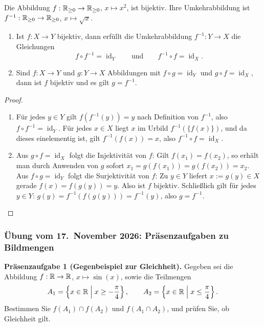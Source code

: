 \begin{beispiel}
Die Abbildung $f:\mathbb{R}_{\ge0}\to\mathbb{R}_{\ge0}$, $x\mapsto x^2$, ist bijektiv.
Ihre Umkehrabbildung ist $f^{-1}:\mathbb{R}_{\ge0}\to\mathbb{R}_{\ge0}$, $x\mapsto\sqrt{x}$.
\end{beispiel}

\begin{satz}
\begin{enumerate}
    \item Ist $f:X\to Y$ bijektiv, dann erfüllt die Umkehrabbildung
    $f^{-1}:Y\to X$ die Gleichungen
    \[
        f\circ f^{-1}=\operatorname{id}_Y
        \qquad\text{und}\qquad
        f^{-1}\circ f=\operatorname{id}_X.
    \]
    \item Sind $f:X\to Y$ und $g:Y\to X$ Abbildungen mit
    $f\circ g=\operatorname{id}_Y$ und $g\circ f=\operatorname{id}_X$,
    dann ist $f$ bijektiv und es gilt $g=f^{-1}$.
\end{enumerate}
\end{satz}
\begin{proof}
\begin{enumerate}
    \item Für jedes $y\in Y$ gilt $f(f^{-1}(y))=y$ nach Definition von $f^{-1}$,
    also $f\circ f^{-1}=\operatorname{id}_Y$. Für jedes $x\in X$ liegt $x$
    im Urbild $f^{-1}(\{f(x)\})$, und da dieses einelementig ist, gilt
    $f^{-1}(f(x))=x$, also $f^{-1}\circ f=\operatorname{id}_X$.
    \item Aus $g\circ f=\operatorname{id}_X$ folgt die Injektivität von $f$:
    Gilt $f(x_1)=f(x_2)$, so erhält man durch Anwenden von $g$ sofort
    $x_1=g(f(x_1))=g(f(x_2))=x_2$.
    Aus $f\circ g=\operatorname{id}_Y$ folgt die Surjektivität von $f$:
    Zu $y\in Y$ liefert $x:=g(y)\in X$ gerade $f(x)=f(g(y))=y$.
    Also ist $f$ bijektiv. Schließlich gilt für jedes $y\in Y$:
    $g(y)=f^{-1}(f(g(y)))=f^{-1}(y)$, also $g=f^{-1}$. \qedhere
\end{enumerate}
\end{proof}

\subsubsection*{Übung vom 17.\ November 2026: Präsenzaufgaben zu Bildmengen}

\noindent\textbf{Präsenzaufgabe 1 (Gegenbeispiel zur Gleichheit).}
Gegeben sei die Abbildung $f:\mathbb{R}\to\mathbb{R}$, $x\mapsto\sin(x)$, sowie die Teilmengen
\[
    A_1 = \left\{x\in\mathbb{R} \;\middle|\; x\ge -\frac{\pi}{4}\right\},
    \qquad
    A_2 = \left\{x\in\mathbb{R} \;\middle|\; x\le \frac{\pi}{4}\right\}.
\]
Bestimmen Sie $f(A_1)\cap f(A_2)$ und $f(A_1\cap A_2)$, und prüfen Sie, ob Gleichheit gilt.

